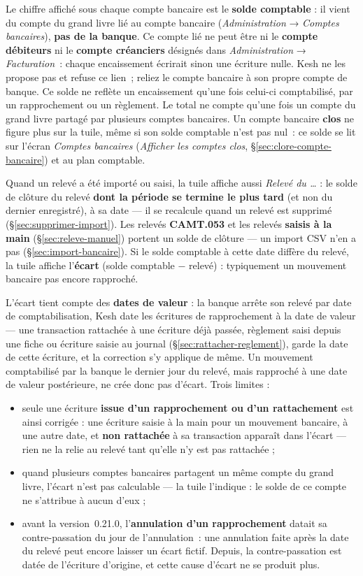 \documentclass[a4paper,11pt,oneside]{article}
\begin{document}
Le chiffre affiché sous chaque compte bancaire est le \textbf{solde comptable} : il vient
du compte du grand livre lié au compte bancaire (\emph{Administration} → \emph{Comptes
bancaires}), \textbf{pas de la banque}. Ce compte lié ne peut être ni le \textbf{compte
débiteurs} ni le \textbf{compte créanciers} désignés dans \emph{Administration} →
\emph{Facturation}~: chaque encaissement écrirait sinon une écriture nulle. Kesh ne les
propose pas et refuse ce lien~; reliez le compte bancaire à son propre compte de banque.
Ce solde ne reflète un encaissement qu'une fois celui-ci comptabilisé, par un rapprochement
ou un règlement. Le total ne compte qu'une fois un
compte du grand livre partagé par plusieurs comptes bancaires. Un compte bancaire
\textbf{clos} ne figure plus sur la tuile, même si son solde comptable n'est pas nul~: ce solde
se lit sur l'écran \emph{Comptes bancaires} (\emph{Afficher les comptes clos},
\S\ref{sec:clore-compte-bancaire}) et au plan comptable.

Quand un relevé a été importé ou saisi, la tuile affiche aussi \emph{Relevé du \dots} : le solde de
clôture du relevé \textbf{dont la période se termine le plus tard} (et non du dernier enregistré), à sa
date --- il se recalcule quand un relevé est supprimé (\S\ref{sec:supprimer-import}). Les relevés \textbf{CAMT.053}
et les relevés \textbf{saisis à la main} (\S\ref{sec:releve-manuel}) portent un solde de clôture — un import CSV n'en a pas (\S\ref{sec:import-bancaire}). Si
le solde comptable à cette date diffère du relevé, la tuile affiche l'\textbf{écart}
(solde comptable − relevé) : typiquement un mouvement bancaire pas encore rapproché.

L'écart tient compte des \textbf{dates de valeur} : la banque arrête son relevé par date de
comptabilisation, Kesh date les écritures de rapprochement à la date de valeur --- une
transaction rattachée à une écriture déjà passée, règlement saisi depuis une fiche ou
écriture saisie au journal (\S\ref{sec:rattacher-reglement}), garde la date de cette écriture,
et la correction s'y applique de même. Un
mouvement comptabilisé par la banque le dernier jour du relevé, mais rapproché à une date
de valeur postérieure, ne crée donc pas d'écart. Trois limites :
\begin{itemize}
    \item seule une écriture \textbf{issue d'un rapprochement ou d'un rattachement} est ainsi corrigée : une
    écriture saisie à la main pour un mouvement bancaire, à une autre date, et \textbf{non
    rattachée} à sa transaction apparaît dans l'écart --- rien ne la relie au relevé tant
    qu'elle n'y est pas rattachée ;
    \item quand plusieurs comptes bancaires partagent un même compte du grand livre,
    l'écart n'est pas calculable — la tuile l'indique : le solde de ce compte ne
    s'attribue à aucun d'eux ;
    \item avant la version~0.21.0, l'\textbf{annulation d'un rapprochement} datait sa
    contre-passation du jour de l'annulation~: une annulation faite après la date du relevé
    peut encore laisser un écart fictif. Depuis, la contre-passation est datée de l'écriture
    d'origine, et cette cause d'écart ne se produit plus.
\end{itemize}
\end{document}
